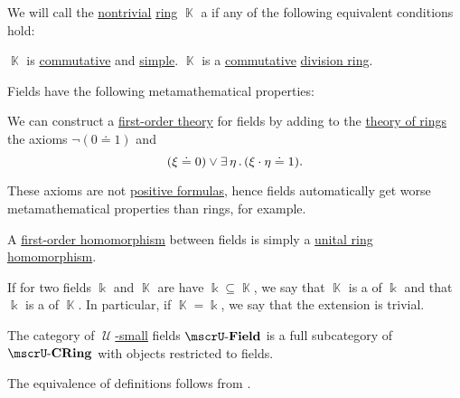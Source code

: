 \begin{definition}\label{def:field}
  We will call the \hyperref[def:ring/trivial]{nontrivial} \hyperref[def:ring]{ring} \( \BbbK \) a  if any of the following equivalent conditions hold:
  \begin{thmenum}
     \( \BbbK \) is \hyperref[def:ring/commutative]{commutative} and \hyperref[def:ring/simple]{simple}.
     \( \BbbK \) is a \hyperref[def:ring/commutative]{commutative} \hyperref[def:division_ring]{division ring}.
  \end{thmenum}

  Fields have the following metamathematical properties:
  \begin{thmenum}
     We can construct a \hyperref[def:first_order_theory]{first-order theory} for fields by adding to the \hyperref[def:semiring/theory]{theory of rings} the axioms \( \neg (0 \doteq 1) \) and
    \begin{equation}\label{eq:def:field/theory/invertibility}
      (\xi \doteq 0) \vee \exists \thinspace \eta \thinspace . \thinspace (\xi \cdot \eta \doteq 1).
    \end{equation}

    These axioms are not \hyperref[def:positive_formula]{positive formulas}, hence fields automatically get worse metamathematical properties than rings, for example.

     A \hyperref[def:first_order_homomorphism]{first-order homomorphism} between fields is simply a \hyperref[def:ring/homomorphism]{unital ring homomorphism}.

     If for two fields \( \Bbbk \) and \( \BbbK \) are have \( \Bbbk \subseteq \BbbK \), we say that \( \BbbK \) is a  of \( \Bbbk \) and that \( \Bbbk \) is a  of \( \BbbK \). In particular, if \( \BbbK = \Bbbk \), we say that the extension is trivial.

     The category of \hyperref[def:large_and_small_sets]{\( \mscrU \)-small} fields \( \ucat{Field} \) is a full subcategory of \hyperref[def:ring/category]{\( \ucat{CRing} \)} with objects restricted to fields.
  \end{thmenum}
\end{definition}
\begin{defproof}
  The equivalence of definitions follows from .
\end{defproof}

